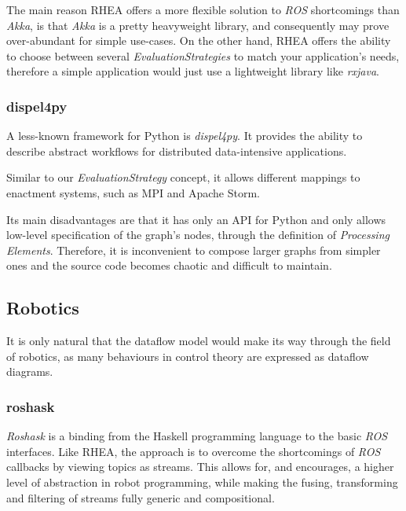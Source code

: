 \documentclass[sigplan,review,anonymous]{acmart}\settopmatter{printfolios=true,printacmref=false}
\begin{document}

The main reason \textsc{RHEA} offers a more flexible solution to \textit{ROS} shortcomings than \textit{Akka}, is that \textit{Akka} is a pretty heavyweight library, and consequently may prove over-abundant for simple use-cases. On the other hand, \textsc{RHEA} offers the ability to choose between several \textit{EvaluationStrategies} to match your application's needs, therefore a simple application would just use a lightweight library like \textit{rxjava}.

\subsubsection{dispel4py}

A less-known framework for Python is \textit{dispel4py}. It provides the ability to describe abstract workflows for distributed data-intensive applications.

Similar to our \textit{EvaluationStrategy} concept, it allows different mappings to enactment systems, such as MPI and Apache Storm.

Its main disadvantages are that it has only an API for Python and only allows low-level specification of the graph's nodes, through the definition of \textit{Processing Elements}. Therefore, it is inconvenient to compose larger graphs from simpler ones and the source code becomes chaotic and difficult to maintain.

\subsection{Robotics}

It is only natural that the dataflow model would make its way through the field of robotics, as many behaviours in control theory are expressed as dataflow diagrams.

\subsubsection{roshask}

\textit{Roshask}\cite{roshask} is a binding from the Haskell programming language to the basic \textit{ROS} interfaces. Like \textsc{RHEA}, the approach is to overcome the shortcomings of \textit{ROS} callbacks by viewing topics as streams. This allows for, and encourages, a higher level of abstraction in robot programming, while making the fusing, transforming and filtering of streams fully generic and compositional.
\end{document}
